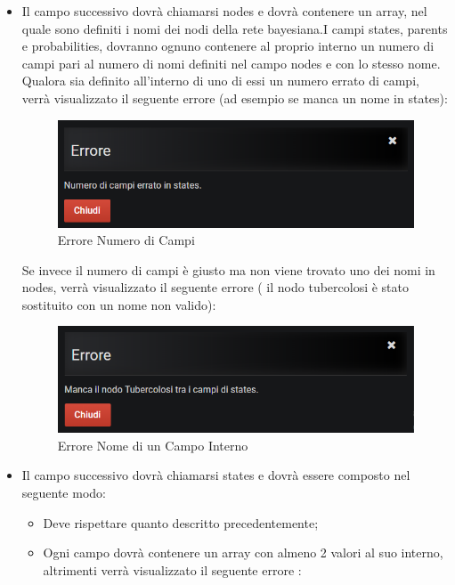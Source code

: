 \begin{itemize}
	\label{nomi} 
	\item Il campo successivo dovrà chiamarsi nodes e dovrà contenere un array, nel quale sono definiti i nomi dei nodi della rete bayesiana.I campi states, parents e probabilities, dovranno ognuno contenere al proprio interno un numero di campi pari al numero di nomi definiti nel campo nodes e con lo stesso nome. Qualora sia definito all'interno di uno di essi un numero errato di campi, verrà visualizzato il seguente errore (ad esempio se manca un nome in states): 

\begin{figure}[H]
	\begin{center}
		\includegraphics[scale=0.8]{./images/numberFields.png}
		 \caption{Errore Numero di Campi}	
		 \label{erNumCampi}
	\end{center}
\end{figure}

Se invece il numero di campi è giusto ma non viene trovato uno dei nomi in nodes, verrà visualizzato il seguente errore ( il nodo tubercolosi è stato sostituito con un nome non valido):

\begin{figure}[H]
	\begin{center}
		\includegraphics[scale=0.8]{./images/wrongName.png}
		 \caption{Errore Nome di un Campo Interno}	
		 \label{erNumCampiInterno}
	\end{center}
\end{figure}

	\item Il campo successivo dovrà chiamarsi states e dovrà essere composto nel seguente modo:
	\begin{itemize}
		\item Deve rispettare quanto descritto precedentemente;
		\item Ogni campo dovrà contenere un array con almeno 2 valori al suo interno, altrimenti verrà visualizzato il seguente errore :
		

\end{itemize}
\end{itemize}
